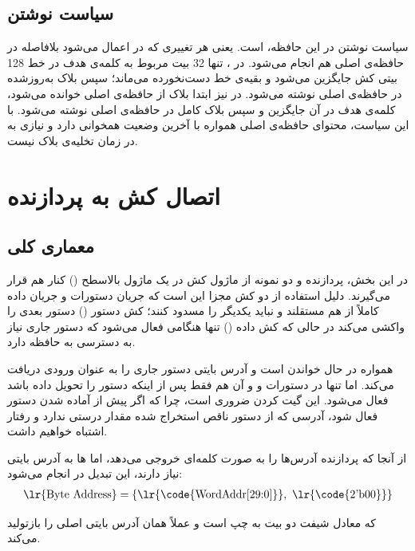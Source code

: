 \subsection{سیاست نوشتن}
سیاست نوشتن در این حافظه،  است. یعنی هر تغییری که در  اعمال می‌شود بلافاصله در حافظه‌ی اصلی هم انجام می‌شود. در ، تنها 32 بیت مربوط به کلمه‌ی هدف در خط 128 بیتی کش جایگزین می‌شود و بقیه‌ی خط دست‌نخورده می‌ماند؛ سپس بلاک به‌روزشده در حافظه‌ی اصلی نوشته می‌شود. در  نیز ابتدا بلاک از حافظه‌ی اصلی خوانده می‌شود، کلمه‌ی هدف در آن جایگزین و سپس بلاک کامل در حافظه‌ی اصلی نوشته می‌شود. با این سیاست، محتوای حافظه‌ی اصلی همواره با آخرین وضعیت  همخوانی دارد و نیازی به  در زمان تخلیه‌ی بلاک نیست.

\section{اتصال کش به پردازنده}

\subsection{معماری کلی}
در این بخش، پردازنده و دو نمونه از ماژول کش در یک ماژول بالاسطح () کنار هم قرار می‌گیرند. دلیل استفاده از دو کش مجزا این است که جریان دستورات و جریان داده کاملاً از هم مستقلند و نباید یکدیگر را مسدود کنند؛ کش دستور () دستور بعدی را واکشی می‌کند در حالی که کش داده () تنها هنگامی فعال می‌شود که دستور جاری نیاز به دسترسی به حافظه دارد.

 همواره در حال خواندن است و آدرس بایتی دستور جاری را به عنوان ورودی دریافت می‌کند. اما  تنها در دستورات  و  و آن هم فقط پس از اینکه  دستور را تحویل داده باشد فعال می‌شود. این گیت کردن ضروری است، چرا که اگر  پیش از آماده شدن دستور فعال شود، آدرسی که از دستور ناقص استخراج شده مقدار درستی ندارد و رفتار اشتباه خواهیم داشت.

از آنجا که پردازنده آدرس‌ها را به صورت کلمه‌ای خروجی می‌دهد، اما  ها به آدرس بایتی نیاز دارند، این تبدیل در  انجام می‌شود:
\begin{align*}
    \text{\lr{Byte Address}} = \{\text{\lr{\code{WordAddr[29:0]}}},\ \text{\lr{\code{2'b00}}}\}
\end{align*}

که معادل شیفت دو بیت به چپ است و عملاً همان آدرس بایتی اصلی را بازتولید می‌کند.

